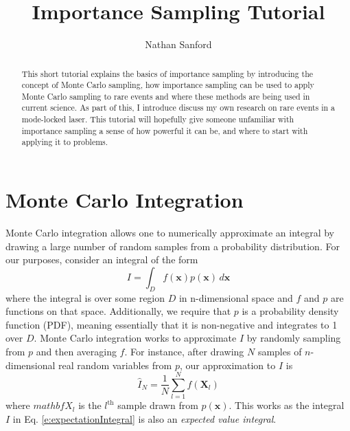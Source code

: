\documentclass[12pt]{scrartcl}
\title{Importance Sampling Tutorial}
\author{Nathan Sanford}
\begin{document}
\maketitle

\begin{abstract}
This short tutorial explains the basics of importance sampling by introducing the concept of Monte Carlo sampling, how importance sampling can be used to apply Monte Carlo sampling to rare events and where these methods are being used in current science. As part of this, I introduce discuss my own research on rare events in a mode-locked laser. This tutorial will hopefully give someone unfamiliar with importance sampling a sense of how powerful it can be, and where to start with applying it to problems.
\end{abstract}

\section{Monte Carlo Integration}

Monte Carlo integration allows one to numerically approximate an integral by drawing a large number of random samples from a probability distribution. For our purposes, consider an integral of the form
%
\begin{equation}
\label{e:expectationIntegral}
I = \int_{D} f(\mathbf{x})p(\mathbf{x})\,d\mathbf{x}
\end{equation}
%
where the integral is over some region $D$ in n-dimensional space and $f$ and $p$ are functions on that space. Additionally, we require that $p$ is a probability density function (PDF), meaning essentially that it is non-negative and integrates to 1 over $D$. Monte Carlo integration works to approximate $I$ by randomly sampling from $p$ and then averaging $f$. For instance, after drawing $N$ samples of $n$-dimensional real random variables from $p$, our approximation to $I$ is
%
\begin{equation}
\label{e:MC_sum}
\hat{I}_N = \frac{1}{N}\sum_{l=1}^N f(\mathbf{X}_l)
\end{equation}
%
where $mathbf{X}_l$ is the $l^{\text{th}}$ sample drawn from $p(\mathbf{x})$. This works as the integral $I$ in Eq. \eqref{e:expectationIntegral} is also an \textit{expected value integral}. 
\end{document}
